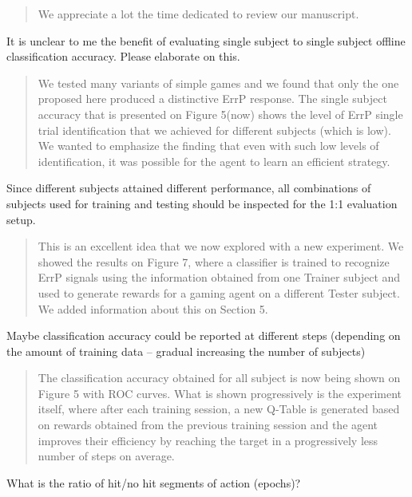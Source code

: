\documentclass[journal,onecolumn,12pt]{IEEEtran}
\begin{document}
\begin{quotation}
{\color{blue}
We appreciate a lot the time dedicated to review our manuscript.
}
\end{quotation}


It is unclear to me the benefit of evaluating single subject to single subject offline classification accuracy. Please elaborate on this. 

\begin{quotation}
{\color{blue}
We tested many variants of simple games and we found that only the one proposed here produced a distinctive  ErrP response. The single subject accuracy that is presented on Figure 5(now) shows the level of ErrP single trial identification that we achieved for different subjects (which is low).  We wanted to emphasize the finding that even with such low levels of identification, it was possible for the agent to learn an efficient strategy.
}
\end{quotation}

Since different subjects attained different performance, all combinations of subjects used for training and testing should be inspected for the 1:1 evaluation setup. 

\begin{quotation}
{\color{blue}
This is an excellent idea that we now explored with a new experiment.  We showed the results on Figure 7, where a classifier is trained to recognize ErrP signals using the information obtained from one Trainer subject and used to generate rewards for a gaming agent on a different Tester subject.  We added information about this on Section 5.
}
\end{quotation}

Maybe classification accuracy could be reported at different steps (depending on the amount of training data – gradual increasing the number of subjects)

\begin{quotation}
{\color{blue}
The classification accuracy obtained for all subject is now being shown on Figure 5 with ROC curves.  What is shown progressively is the experiment itself, where after each training session, a new Q-Table is generated based on rewards obtained from the previous training session and the agent improves their efficiency by reaching the target in a progressively less number of steps on average.  
}
\end{quotation}


What is the ratio of hit/no hit segments of action (epochs)?
\end{document}
